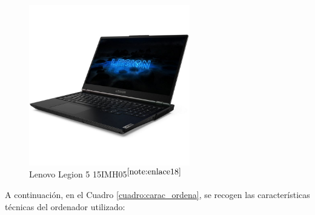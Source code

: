 \begin{figure} [H]
    \begin{center}
      \includegraphics[width=7cm]{figs/Lenovo Legion 5 15imh05.jpg}
    \end{center}
    \caption{Lenovo Legion 5 15IMH05$^{\ref{note:enlace18}}$}
    \label{fig:PC_Lenovo}
\end{figure}

\setcounter{footnote}{18}
    
A continuación, en el Cuadro \ref{cuadro:carac_ordena}, se recogen las características técnicas del ordenador utilizado:

